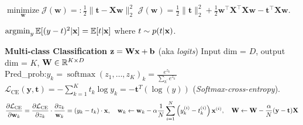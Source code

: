 \documentclass[4pt]{article}
\begin{document}
	$\underset{\mathbf{w}}{\operatorname{minimize}} \mathcal{J}(\mathbf{w})=: \frac{1}{2}\|\mathbf{t}-\mathbf{X} \mathbf{w}\|_{2}^{2}$ \quad $\mathcal{J}(\mathbf{w})=\frac{1}{2}\|\mathbf{t}\|_{2}^{2}+\frac{1}{2} \mathbf{w}^{\top} \mathbf{X}^{\top} \mathbf{X} \mathbf{w}-\mathbf{t}^{\top} \mathbf{X} \mathbf{w}$. \\
	\begin{theorem}
		$
			\operatorname*{argmin}_{y} \mathbb{E}[{(y-t)^2|\textbf{x}}] = \mathbb{E}[{t|\textbf{x}}]
		$
		where $t \sim p(t|\textbf{x})$.
	\end{theorem}
	\textbf{Multi-class Classification} $\textbf{z} = \bf{W} \textbf{x} + \textbf{b}$ (aka \emph{logits}) Input dim = $D$, output dim = $K$, $\textbf{W} \in \mathbb{R}^{K \times D}$ \\
	Pred\_prob:$y_{k}=\operatorname{softmax}\left(z_{1}, \ldots, z_{K}\right)_{k}=\frac{e^{z_{k}}}{\sum_{k^{\prime}} e^{z_{k^{\prime}}}}$ \quad
	$\mathcal{L}_{\mathrm{CE}}(\mathbf{y}, \mathbf{t})=-\sum_{k=1}^{K} t_{k} \log y_{k} = - \textbf{t}^T (\log (y))$ (\emph{Softmax-cross-entropy}). \\
	\begin{align*}
		\begin{aligned} \frac{\partial \mathcal{L}_{\mathrm{CE}}}{\partial \mathbf{w}_{k}} =\frac{\partial \mathcal{L}_{\mathrm{CE}}}{\partial z_{k}} \cdot \frac{\partial z_{k}}{\mathbf{w}_{k}}=\left(y_{k}-t_{k}\right) \cdot \mathbf{x}, 
		\quad \mathbf{w}_{k}  \leftarrow \mathbf{w}_{k}-\alpha \frac{1}{N} \sum_{i=1}^{N}\left(y_{k}^{(i)}-t_{k}^{(i)}\right) \mathbf{x}^{(i)} \end{aligned},
		\quad \textbf{W} \leftarrow \textbf{W} - \frac{\alpha}{N} (\textbf{y} - \textbf{t}) \textbf{X}
	\end{align*}
	
\end{document}
